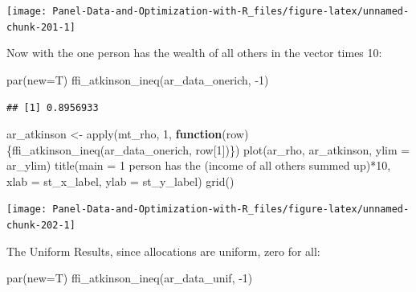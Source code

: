 \documentclass[
]{book}
\newenvironment{Shaded}{\begin{snugshade}}{\end{snugshade}}
\newcommand{\AttributeTok}[1]{\textcolor[rgb]{0.77,0.63,0.00}{#1}}
\newcommand{\ControlFlowTok}[1]{\textcolor[rgb]{0.13,0.29,0.53}{\textbf{#1}}}
\newcommand{\DecValTok}[1]{\textcolor[rgb]{0.00,0.00,0.81}{#1}}
\newcommand{\FunctionTok}[1]{\textcolor[rgb]{0.00,0.00,0.00}{#1}}
\newcommand{\NormalTok}[1]{#1}
\newcommand{\OtherTok}[1]{\textcolor[rgb]{0.56,0.35,0.01}{#1}}
\newcommand{\SpecialCharTok}[1]{\textcolor[rgb]{0.00,0.00,0.00}{#1}}
\newcommand{\StringTok}[1]{\textcolor[rgb]{0.31,0.60,0.02}{#1}}
\begin{document}
\begin{center}\texttt{[image: Panel-Data-and-Optimization-with-R\_files/figure-latex/unnamed-chunk-201-1]} \end{center}

Now with the one person has the wealth of all others in the vector times 10:

\begin{Shaded}
\begin{Highlighting}[]
\FunctionTok{par}\NormalTok{(}\AttributeTok{new=}\NormalTok{T)}
\FunctionTok{ffi\_atkinson\_ineq}\NormalTok{(ar\_data\_onerich, }\SpecialCharTok{{-}}\DecValTok{1}\NormalTok{)}
\end{Highlighting}
\end{Shaded}

\begin{verbatim}
## [1] 0.8956933
\end{verbatim}

\begin{Shaded}
\begin{Highlighting}[]
\NormalTok{ar\_atkinson }\OtherTok{\textless{}{-}} \FunctionTok{apply}\NormalTok{(mt\_rho, }\DecValTok{1}\NormalTok{, }\ControlFlowTok{function}\NormalTok{(row)\{}\FunctionTok{ffi\_atkinson\_ineq}\NormalTok{(ar\_data\_onerich, row[}\DecValTok{1}\NormalTok{])\})}
\FunctionTok{plot}\NormalTok{(ar\_rho, ar\_atkinson, }\AttributeTok{ylim =}\NormalTok{ ar\_ylim)}
\FunctionTok{title}\NormalTok{(}\AttributeTok{main =} \StringTok{\textquotesingle{}1 person has the (income of all others summed up)*10\textquotesingle{}}\NormalTok{, }\AttributeTok{xlab =}\NormalTok{ st\_x\_label, }\AttributeTok{ylab =}\NormalTok{ st\_y\_label)}
\FunctionTok{grid}\NormalTok{()}
\end{Highlighting}
\end{Shaded}

\begin{center}\texttt{[image: Panel-Data-and-Optimization-with-R\_files/figure-latex/unnamed-chunk-202-1]} \end{center}

The Uniform Results, since allocations are uniform, zero for all:

\begin{Shaded}
\begin{Highlighting}[]
\FunctionTok{par}\NormalTok{(}\AttributeTok{new=}\NormalTok{T)}
\FunctionTok{ffi\_atkinson\_ineq}\NormalTok{(ar\_data\_unif, }\SpecialCharTok{{-}}\DecValTok{1}\NormalTok{)}
\end{Highlighting}
\end{Shaded}
\end{document}

